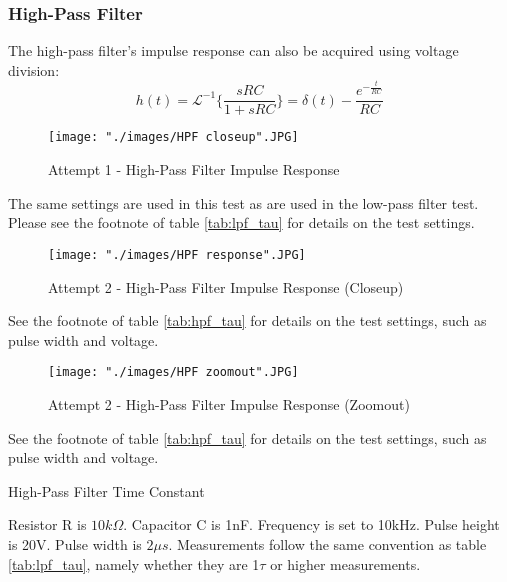 \subsubsection{High-Pass Filter}
The high-pass filter's impulse response can also be acquired using voltage division:
\begin{equation}
	\label{eq:ir_hpf}
	h(t) = \mathcal{L}^{-1}\{ \frac{ sRC }{ 1 + sRC } \} = \delta(t) - \frac{ e^{- \frac{t}{RC} } }{RC}
\end{equation}

\FloatBarrier

\begin{figure}[h!]
\centering
\texttt{[image: "./images/HPF closeup".JPG]}
\caption{Attempt 1 - High-Pass Filter Impulse Response}
\label{fig:lpf_response}
\end{figure}

\FloatBarrier

{\footnotesize The same settings are used in this test as are used in the low-pass filter test. Please see the footnote of table \ref{tab:lpf_tau} for details on the test settings.}

\FloatBarrier

\begin{figure}[h!]
\centering
\texttt{[image: "./images/HPF response".JPG]}
\caption{Attempt 2 - High-Pass Filter Impulse Response (Closeup)}
\label{fig:hpf_response_closeup}
\end{figure}

\FloatBarrier

{\footnotesize See the footnote of table \ref{tab:hpf_tau} for details on the test settings, such as pulse width and voltage.}

\FloatBarrier

\begin{figure}[h!]
\centering
\texttt{[image: "./images/HPF zoomout".JPG]}
\caption{Attempt 2 - High-Pass Filter Impulse Response (Zoomout)}
\label{fig:hpf_response_zoomout}
\end{figure}

\FloatBarrier

{\footnotesize See the footnote of table \ref{tab:hpf_tau} for details on the test settings, such as pulse width and voltage.}

\FloatBarrier

\begin{table}[h!]
\centering
\caption{High-Pass Filter Time Constant}
\label{tab:hpf_tau}
\end{table}
{\footnotesize Resistor R is $10k\Omega$. Capacitor C is 1nF. Frequency is set to 10kHz. Pulse height is 20V. Pulse width is $2\mu s$. Measurements follow the same convention as table \ref{tab:lpf_tau}, namely whether they are 1$\tau$ or higher measurements.} \\
\FloatBarrier

